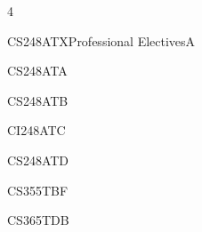 \documentclass[a4paper]{syllabus}
\begin{document}
\begin{semester}{4}
    \begin{electivegroup}{CS248ATX}{Professional Electives}{A}
    	\begin{definecourse}{CS248ATA}
	  \end{definecourse}
	  \begin{definecourse}{CS248ATB}
	  \end{definecourse}
	  \begin{definecourse}{CI248ATC}
	  \end{definecourse}
	  \begin{definecourse}{CS248ATD}
	  \end{definecourse}
	  \begin{definecourse}{CS355TBF}
	  \end{definecourse}
	  \begin{definecourse}{CS365TDB}
	  \end{definecourse}
	\end{electivegroup}
	

\end{semester}
\end{document}
